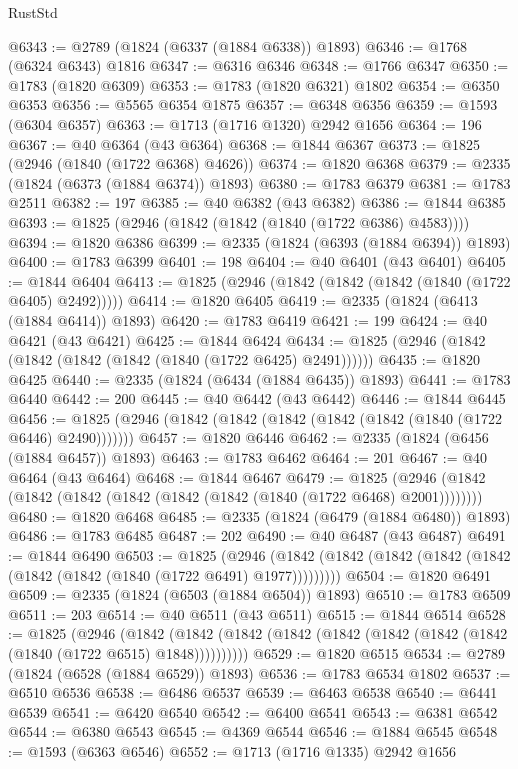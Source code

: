\begin{lexlean}{RustStd}
\begin{coremodule}
@6343 := @2789 (@1824 (@6337 (@1884 @6338)) @1893)
@6346 := @1768 (@6324 @6343) @1816
@6347 := @6316 @6346
@6348 := @1766 @6347
@6350 := @1783 (@1820 @6309)
@6353 := @1783 (@1820 @6321) @1802
@6354 := @6350 @6353
@6356 := @5565 @6354 @1875
@6357 := @6348 @6356
@6359 := @1593 (@6304 @6357)
@6363 := @1713 (@1716 @1320) @2942 @1656
@6364 := 196
@6367 := @40 @6364 (@43 @6364)
@6368 := @1844 @6367
@6373 := @1825 (@2946 (@1840 (@1722 @6368) @4626))
@6374 := @1820 @6368
@6379 := @2335 (@1824 (@6373 (@1884 @6374)) @1893)
@6380 := @1783 @6379
@6381 := @1783 @2511
@6382 := 197
@6385 := @40 @6382 (@43 @6382)
@6386 := @1844 @6385
@6393 := @1825 (@2946 (@1842 (@1842 (@1840 (@1722 @6386) @4583))))
@6394 := @1820 @6386
@6399 := @2335 (@1824 (@6393 (@1884 @6394)) @1893)
@6400 := @1783 @6399
@6401 := 198
@6404 := @40 @6401 (@43 @6401)
@6405 := @1844 @6404
@6413 := @1825 (@2946 (@1842 (@1842 (@1842 (@1840 (@1722 @6405) @2492)))))
@6414 := @1820 @6405
@6419 := @2335 (@1824 (@6413 (@1884 @6414)) @1893)
@6420 := @1783 @6419
@6421 := 199
@6424 := @40 @6421 (@43 @6421)
@6425 := @1844 @6424
@6434 := @1825 (@2946 (@1842 (@1842 (@1842 (@1842 (@1840 (@1722 @6425) @2491))))))
@6435 := @1820 @6425
@6440 := @2335 (@1824 (@6434 (@1884 @6435)) @1893)
@6441 := @1783 @6440
@6442 := 200
@6445 := @40 @6442 (@43 @6442)
@6446 := @1844 @6445
@6456 := @1825 (@2946 (@1842 (@1842 (@1842 (@1842 (@1842 (@1840 (@1722 @6446) @2490)))))))
@6457 := @1820 @6446
@6462 := @2335 (@1824 (@6456 (@1884 @6457)) @1893)
@6463 := @1783 @6462
@6464 := 201
@6467 := @40 @6464 (@43 @6464)
@6468 := @1844 @6467
@6479 := @1825 (@2946 (@1842 (@1842 (@1842 (@1842 (@1842 (@1842 (@1840 (@1722 @6468) @2001))))))))
@6480 := @1820 @6468
@6485 := @2335 (@1824 (@6479 (@1884 @6480)) @1893)
@6486 := @1783 @6485
@6487 := 202
@6490 := @40 @6487 (@43 @6487)
@6491 := @1844 @6490
@6503 := @1825
    (@2946 (@1842 (@1842 (@1842 (@1842 (@1842 (@1842 (@1842 (@1840 (@1722 @6491) @1977)))))))))
@6504 := @1820 @6491
@6509 := @2335 (@1824 (@6503 (@1884 @6504)) @1893)
@6510 := @1783 @6509
@6511 := 203
@6514 := @40 @6511 (@43 @6511)
@6515 := @1844 @6514
@6528 := @1825
    (@2946
      (@1842 (@1842 (@1842 (@1842 (@1842 (@1842 (@1842 (@1842 (@1840 (@1722 @6515) @1848))))))))))
@6529 := @1820 @6515
@6534 := @2789 (@1824 (@6528 (@1884 @6529)) @1893)
@6536 := @1783 @6534 @1802
@6537 := @6510 @6536
@6538 := @6486 @6537
@6539 := @6463 @6538
@6540 := @6441 @6539
@6541 := @6420 @6540
@6542 := @6400 @6541
@6543 := @6381 @6542
@6544 := @6380 @6543
@6545 := @4369 @6544
@6546 := @1884 @6545
@6548 := @1593 (@6363 @6546)
@6552 := @1713 (@1716 @1335) @2942 @1656

\end{coremodule}
\end{lexlean}
